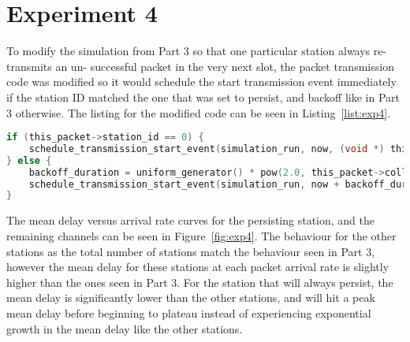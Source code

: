 \section*{Experiment 4}
To modify the simulation from Part 3 so that one particular station always re-transmits an un-
successful packet in the very next slot, the packet transmission code was modified so it would schedule the start transmission event immediately if the station ID matched the one that was set to persist, and backoff like in Part 3 otherwise. The listing for the modified code can be seen in Listing~\ref{list:exp4}.

\begin{lstlisting}[language=c,caption=Binary Exponential Backoff with Single Persisting Channel, label=list:exp4]
if (this_packet->station_id == 0) {
	schedule_transmission_start_event(simulation_run, now, (void *) this_packet);
} else {
	backoff_duration = uniform_generator() * pow(2.0, this_packet->collision_count);
	schedule_transmission_start_event(simulation_run, now + backoff_duration, (void *) this_packet);
}
\end{lstlisting}

The mean delay versus arrival rate curves for the persisting station, and the remaining channels can be seen in Figure~\ref{fig:exp4}. The behaviour for the other stations as the total number of stations match the behaviour seen in Part 3, however the mean delay for these stations at each packet arrival rate is slightly higher than the ones seen in Part 3. For the station that will always persist, the mean delay is significantly lower than the other stations, and will hit a peak mean delay before beginning to plateau instead of experiencing exponential growth in the mean delay like the other stations.

